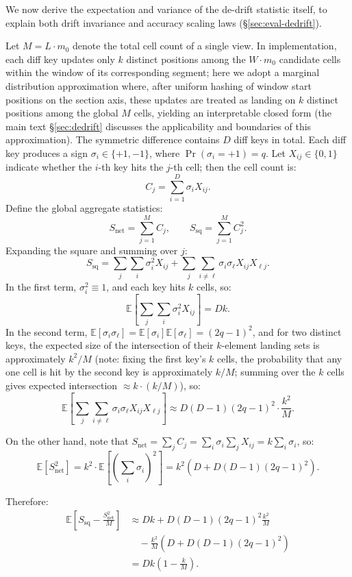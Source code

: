 We now derive the expectation and variance of the de-drift statistic itself, to explain both drift invariance and accuracy scaling laws (\S\ref{sec:eval-dedrift}).

Let $M=L\cdot m_0$ denote the total cell count of a single view. In implementation, each diff key updates only $k$ distinct positions among the $W\cdot m_0$ candidate cells within the window of its corresponding segment; here we adopt a marginal distribution approximation where, after uniform hashing of window start positions on the section axis, these updates are treated as landing on $k$ distinct positions among the global $M$ cells, yielding an interpretable closed form (the main text \S\ref{sec:dedrift} discusses the applicability and boundaries of this approximation). The symmetric difference contains $D$ diff keys in total. Each diff key produces a sign $\sigma_i\in\{+1,-1\}$, where $\Pr(\sigma_i=+1)=q$. Let $X_{ij}\in\{0,1\}$ indicate whether the $i$-th key hits the $j$-th cell; then the cell count is:
\[
C_j=\sum_{i=1}^{D}\sigma_i X_{ij}.
\]
Define the global aggregate statistics:
\[
S_{\text{net}}=\sum_{j=1}^{M}C_j,\qquad
S_{\text{sq}}=\sum_{j=1}^{M}C_j^2.
\]
Expanding the square and summing over $j$:
\[
S_{\text{sq}}=\sum_{j}\sum_{i}\sigma_i^2 X_{ij}+\sum_{j}\sum_{i\neq \ell}\sigma_i\sigma_\ell X_{ij}X_{\ell j}.
\]
In the first term, $\sigma_i^2\equiv 1$, and each key hits $k$ cells, so:
\[
\mathbb{E}\left[\sum_{j}\sum_{i}\sigma_i^2 X_{ij}\right]=Dk.
\]
In the second term, $\mathbb{E}[\sigma_i\sigma_\ell]=\mathbb{E}[\sigma_i]\mathbb{E}[\sigma_\ell]=(2q-1)^2$, and for two distinct keys, the expected size of the intersection of their $k$-element landing sets is approximately $k^2/M$ (note: fixing the first key's $k$ cells, the probability that any one cell is hit by the second key is approximately $k/M$; summing over the $k$ cells gives expected intersection $\approx k\cdot(k/M)$), so:
\[
\mathbb{E}\left[\sum_{j}\sum_{i\neq \ell}\sigma_i\sigma_\ell X_{ij}X_{\ell j}\right]\approx D(D-1)(2q-1)^2\cdot \frac{k^2}{M}.
\]

On the other hand, note that $S_{\text{net}}=\sum_j C_j=\sum_i \sigma_i\sum_j X_{ij}=k\sum_i \sigma_i$, so:
\[
\mathbb{E}[S_{\text{net}}^2]=k^2\cdot \mathbb{E}\!\left[\left(\sum_i \sigma_i\right)^2\right]
=k^2\left(D + D(D-1)(2q-1)^2\right).
\]

Therefore:
\begin{align*}
\mathbb{E}\!\left[S_{\text{sq}}-\frac{S_{\text{net}}^2}{M}\right]
&\approx Dk + D(D-1)(2q-1)^2\frac{k^2}{M} \\
&\quad -\frac{k^2}{M}\left(D + D(D-1)(2q-1)^2\right) \\
&= Dk\left(1-\frac{k}{M}\right).
\end{align*}


